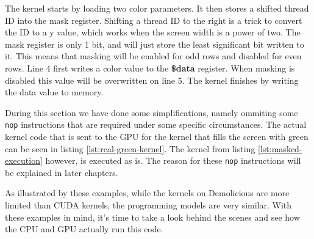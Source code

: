 \documentclass[../main/report.tex]{subfiles}
\begin{document}
The kernel starts by loading two color parameters.
It then stores a shifted thread ID into the mask register.
Shifting a thread ID to the right is a trick to convert the ID to a y value,
which works when the screen width is a power of two.
The mask register is only 1 bit, and will just store the least significant bit written to it.
This means that masking will be enabled for odd rows and disabled for even rows.
Line 4 first writes a color value to the \textbf{\$data} register.
When masking is disabled this value will be overwritten on line 5.
The kernel finishes by writing the data value to memory.

During this section we have done some simplifications, namely ommiting some \verb/nop/ instructions that are required under some specific circumstances.
The actual kernel code that is sent to the GPU for the kernel that fills the screen with green can be seen in listing \ref{lst:real-green-kernel}. The kernel from listing \ref{lst:masked-execution} however, is executed as is. The reason for these \verb/nop/ instructions will be explained in later chapters.


As illustrated by these examples, while the kernels on Demolicious are more limited than CUDA kernels, the programming models are very similar.
With these examples in mind, it's time to take a look behind the scenes and see how the CPU and GPU actually run this code.

\end{document}
